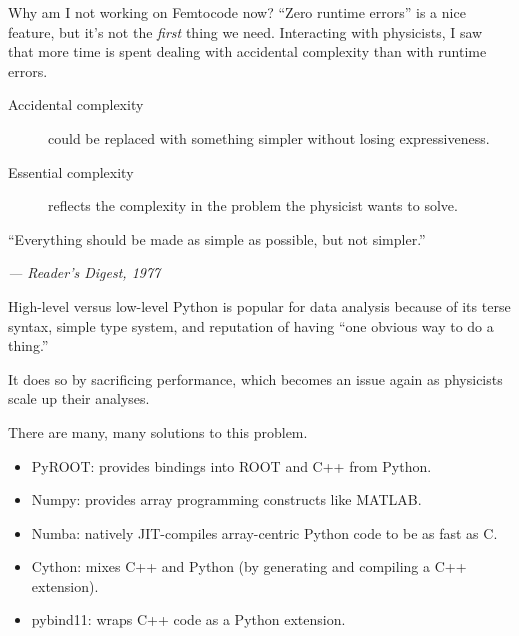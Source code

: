 \documentclass[aspectratio=169]{beamer}
\begin{document}
\begin{frame}{Why am I not working on Femtocode now?}
\large
\vspace{0.5 cm}
``Zero runtime errors'' is a nice feature, but it's not the {\it first} thing we need. Interacting with physicists, I saw that more time is spent dealing with accidental complexity than with runtime errors.

\vspace{0.5 cm}
\begin{center}
\begin{minipage}{0.85\linewidth}
\begin{description}
\item[Accidental complexity] could be replaced with something simpler without losing expressiveness.

\item[Essential complexity] reflects the complexity in the problem the physicist wants to solve.
\end{description}
\end{minipage}
\end{center}

\vspace{1 cm}
``Everything should be made as simple as possible, but not simpler.''

\hfill \it --- Reader's Digest, 1977
\end{frame}

\begin{frame}{High-level versus low-level}
\vspace{0.5 cm}
Python is popular for data analysis because of its terse syntax, simple type system, and reputation of having ``one obvious way to do a thing.''

\vspace{0.5 cm}
It does so by sacrificing performance, which becomes an issue again as physicists scale up their analyses.

\vspace{0.5 cm}
There are many, many solutions to this problem.

\begin{itemize}
\item PyROOT: provides bindings into ROOT and C++ from Python.
\item Numpy: provides array programming constructs like MATLAB.
\item Numba: natively JIT-compiles array-centric Python code to be as fast as C.
\item Cython: mixes C++ and Python (by generating and compiling a C++ extension).
\item pybind11: wraps C++ code as a Python extension.
\end{itemize}
\end{frame}
\end{document}
